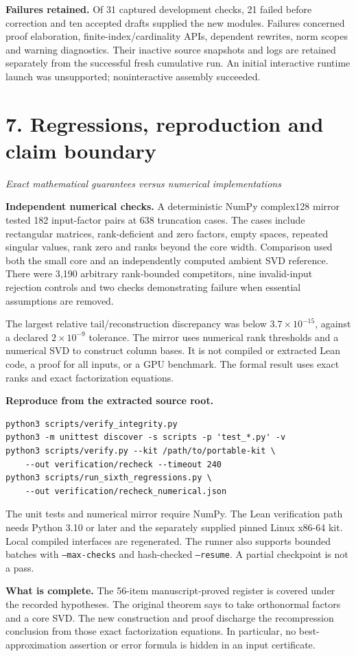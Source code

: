 \documentclass[11pt]{article}
\newcommand{\pageheading}[2]{\section*{\color{ink}#1}\textit{#2}\par}
\begin{document}
\textbf{Failures retained.} Of 31 captured development checks, 21 failed before correction and ten accepted drafts supplied the new modules. Failures concerned proof elaboration, finite-index/cardinality APIs, dependent rewrites, norm scopes and warning diagnostics. Their inactive source snapshots and logs are retained separately from the successful fresh cumulative run. An initial interactive runtime launch was unsupported; noninteractive assembly succeeded.

\newpage
\pageheading{7. Regressions, reproduction and claim boundary}{Exact mathematical guarantees versus numerical implementations}
\textbf{Independent numerical checks.} A deterministic NumPy complex128 mirror tested 182 input-factor pairs at 638 truncation cases. The cases include rectangular matrices, rank-deficient and zero factors, empty spaces, repeated singular values, rank zero and ranks beyond the core width. Comparison used both the small core and an independently computed ambient SVD reference. There were 3,190 arbitrary rank-bounded competitors, nine invalid-input rejection controls and two checks demonstrating failure when essential assumptions are removed.

The largest relative tail/reconstruction discrepancy was below $3.7\times10^{-15}$, against a declared $2\times10^{-9}$ tolerance. The mirror uses numerical rank thresholds and a numerical SVD to construct column bases. It is not compiled or extracted Lean code, a proof for all inputs, or a GPU benchmark. The formal result uses exact ranks and exact factorization equations.

\textbf{Reproduce from the extracted source root.}
\begin{verbatim}
python3 scripts/verify_integrity.py
python3 -m unittest discover -s scripts -p 'test_*.py' -v
python3 scripts/verify.py --kit /path/to/portable-kit \
    --out verification/recheck --timeout 240
python3 scripts/run_sixth_regressions.py \
    --out verification/recheck_numerical.json
\end{verbatim}
The unit tests and numerical mirror require NumPy. The Lean verification path needs Python 3.10 or later and the separately supplied pinned Linux x86-64 kit. Local compiled interfaces are regenerated. The runner also supports bounded batches with \texttt{--max-checks} and hash-checked \texttt{--resume}. A partial checkpoint is not a pass.

\textbf{What is complete.} The 56-item manuscript-proved register is covered under the recorded hypotheses. The original theorem says to take orthonormal factors and a core SVD. The new construction and proof discharge the recompression conclusion from those exact factorization equations. In particular, no best-approximation assertion or error formula is hidden in an input certificate.
\end{document}
